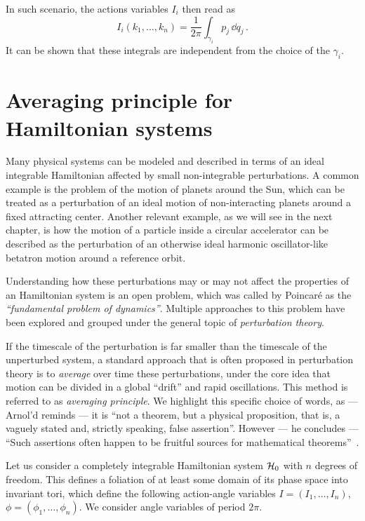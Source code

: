 In such scenario, the actions variables $I_i$ then read as
%
\begin{equation}
    I_i(k_1,\dots,k_n) = \frac{1}{2\pi}\int_{\gamma_i} p_j\, \dd q_j\, .  
\end{equation} 
%
It can be shown that these integrals are independent from the choice of the $\gamma_i$.~\cite{Arnold:937549}

\section{Averaging principle for Hamiltonian systems}\label{sec:1:averaging}

Many physical systems can be modeled and described in terms of an ideal integrable Hamiltonian affected by small non-integrable perturbations. A common example is the problem of the motion of planets around the Sun, which can be treated as a perturbation of an ideal motion of non-interacting planets around a fixed attracting center. Another relevant example, as we will see in the next chapter, is how the motion of a particle inside a circular accelerator can be described as the perturbation of an otherwise ideal harmonic oscillator-like betatron motion around a reference orbit.

Understanding how these perturbations may or may not affect the properties of an Hamiltonian system is an open problem, which was called by Poincaré as the \textit{``fundamental problem of dynamics''}. Multiple approaches to this problem have been explored and grouped under the general topic of \textit{perturbation theory}.

If the timescale of the perturbation is far smaller than the timescale of the unperturbed system, a standard approach that is often proposed in perturbation theory is to \textit{average} over time these perturbations, under the core idea that motion can be divided in a global ``drift'' and rapid oscillations. This method is referred to as \textit{averaging principle}. We highlight this specific choice of words, as --- Arnol'd reminds --- it is ``not a theorem, but a physical proposition, that is, a vaguely stated and, strictly speaking, false assertion''. However --- he concludes --- ``Such assertions often happen to be fruitful sources for mathematical theorems''~\cite{Arnold:937549}.

Let us consider a completely integrable Hamiltonian system $\mathcal{H}_0$ with $n$ degrees of freedom. This defines a foliation of at least some domain of its phase space into invariant tori, which define the following action-angle variables $I=(I_1, \ldots, I_n)$, $\phi=(\phi_1, \ldots, \phi_n)$. We consider angle variables of period $2\pi$.

